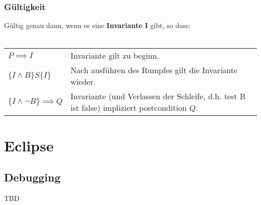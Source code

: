 \documentclass[12pt,a4paper]{article}
\begin{document}
\subsubsection{Gültigkeit}
Gültig genau dann, wenn es eine \textbf{Invariante I} gibt, so dass:\\\\
\begin{tabularx}{\linewidth}{lX}
$P \implies I$ & Invariante gilt zu beginn.\\
$\{I \land B\} S \{I\}$ & Nach ausführen des Rumpfes gilt die Invariante wieder.\\
$\{I \land \neg B\} \implies Q$ & Invariante (und Verlassen der Schleife, d.h. test B ist false) impliziert postcondition $Q$.
\end{tabularx}
\newpage
\section{Eclipse}
\subsection{Debugging}
TBD %
\end{document}
